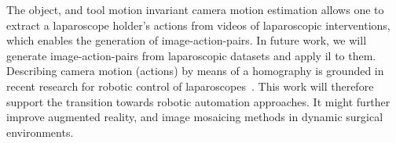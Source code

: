 The object, and tool motion invariant camera motion estimation allows one to extract a laparoscope holder's actions from videos of laparoscopic interventions, which enables the generation of image-action-pairs. In future work, we will generate image-action-pairs from laparoscopic datasets and apply \acrshort{il} to them. Describing camera motion (actions) by means of a homography is grounded in recent research for robotic control of laparoscopes~\cite{huber2021homographybased}. This work will therefore support the transition towards robotic automation approaches. It might further improve augmented reality, and image mosaicing methods in dynamic surgical environments.

